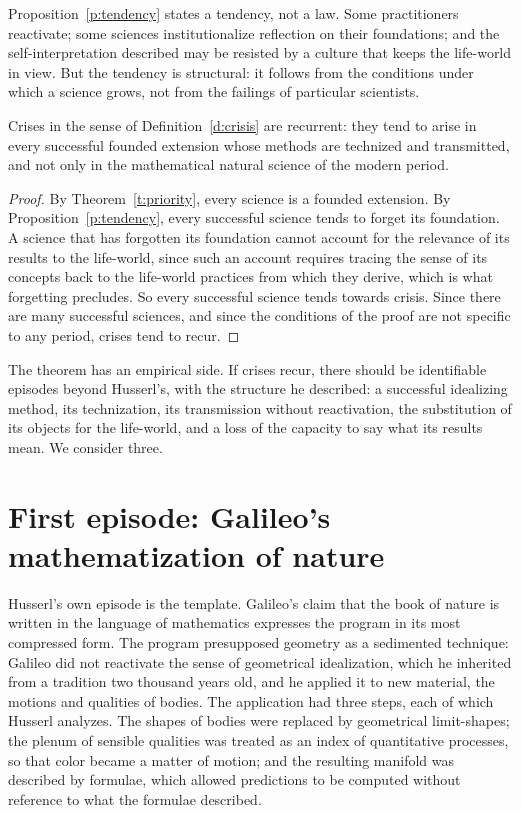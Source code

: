 \documentclass{situationist-preprint}
\begin{document}
Proposition~\ref{p:tendency} states a tendency, not a law. Some practitioners reactivate; some sciences institutionalize reflection on their foundations; and the self-interpretation described may be resisted by a culture that keeps the life-world in view. But the tendency is structural: it follows from the conditions under which a science grows, not from the failings of particular scientists.

\begin{theorem}\label{t:recurrence}
Crises in the sense of Definition~\ref{d:crisis} are recurrent: they tend to arise in every successful founded extension whose methods are technized and transmitted, and not only in the mathematical natural science of the modern period.
\end{theorem}

\begin{proof}
By Theorem~\ref{t:priority}, every science is a founded extension. By Proposition~\ref{p:tendency}, every successful science tends to forget its foundation. A science that has forgotten its foundation cannot account for the relevance of its results to the life-world, since such an account requires tracing the sense of its concepts back to the life-world practices from which they derive, which is what forgetting precludes. So every successful science tends towards crisis. Since there are many successful sciences, and since the conditions of the proof are not specific to any period, crises tend to recur.
\end{proof}

The theorem has an empirical side. If crises recur, there should be identifiable episodes beyond Husserl's, with the structure he described: a successful idealizing method, its technization, its transmission without reactivation, the substitution of its objects for the life-world, and a loss of the capacity to say what its results mean. We consider three.

\section{First episode: Galileo's mathematization of nature}\label{s:galileo}

Husserl's own episode is the template. Galileo's claim that the book of nature is written in the language of mathematics \citep{Galileo1623} expresses the program in its most compressed form. The program presupposed geometry as a sedimented technique: Galileo did not reactivate the sense of geometrical idealization, which he inherited from a tradition two thousand years old, and he applied it to new material, the motions and qualities of bodies. The application had three steps, each of which Husserl analyzes. The shapes of bodies were replaced by geometrical limit-shapes; the plenum of sensible qualities was treated as an index of quantitative processes, so that color became a matter of motion; and the resulting manifold was described by formulae, which allowed predictions to be computed without reference to what the formulae described.
\end{document}
